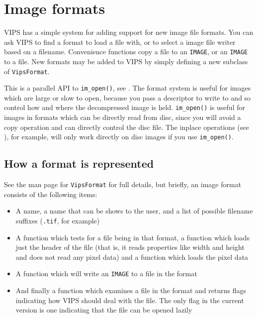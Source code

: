 \section{Image formats}
\label{sec:format}

VIPS has a simple system for adding support for new image file formats. 
You can ask VIPS to find a format to load a file with,
or to select a image file writer based on a filename. Convenience functions
copy a file to an \verb+IMAGE+, or an \verb+IMAGE+ to a file. New formats may
be added to VIPS by simply defining a new subclass of \verb+VipsFormat+.

This is a parallel API to \verb+im_open()+, see . The
format system is useful for images which are large or slow to open,
because you pass a descriptor to write to and so control how and where
the decompressed image is held. \verb+im_open()+ is useful for images in
formats which can be directly read from disc, since you will avoid a copy
operation and can directly control the disc file. The inplace operations
(see ), for example, will only work directly on disc
images if you use \verb+im_open()+.

\subsection{How a format is represented}

See the man page for \verb+VipsFormat+ for full details, but briefly, an image
format consists of the following items:

\begin{itemize}
\item
A name, a name that can be shows to the user, and a list of possible filename
suffixes (\verb+.tif+, for example)

\item
A function which tests for a file being in that format, a function which loads 
just the header of the file (that is, it reads properties like width and
height and does not read any pixel data) and a function which loads the pixel
data

\item
A function which will write an \verb+IMAGE+ to a file in the format

\item
And finally a function which examines a file in the format and returns flags
indicating how VIPS should deal with the file. The only flag in the current
version is one indicating that the file can be opened lazily

\end{itemize}

